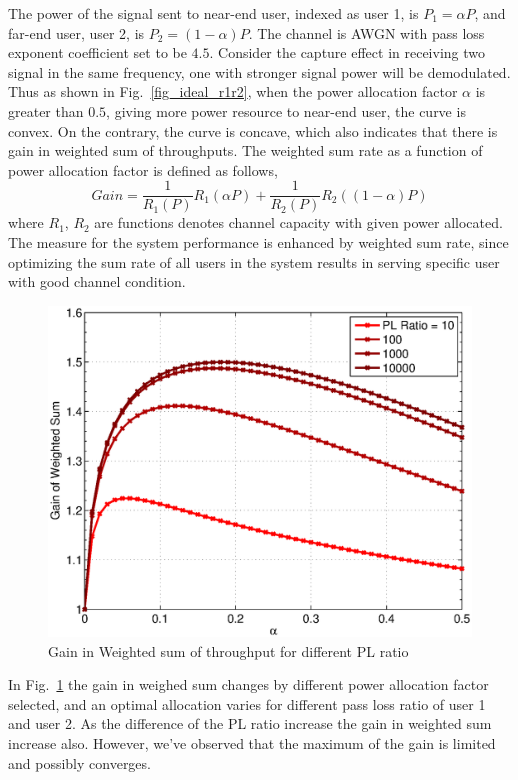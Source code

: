 The power of the signal sent to near-end user, indexed as user 1, is $P_1=\alpha P$,
and far-end user, user 2, is $P_2=(1-\alpha)P$.
The channel is AWGN with pass loss exponent coefficient set to be $4.5$.
Consider the capture effect in receiving two signal in the same frequency, one with
stronger signal power will be demodulated. 
Thus as shown in Fig.~\ref{fig_ideal_r1r2}, when the power allocation factor $\alpha$
is greater than $0.5$, giving more power resource to near-end user, the curve is
convex. 
On the contrary, the curve is concave, which also indicates that there is
gain in weighted sum of throughputs.
The weighted sum rate \cite{cite_bell1} as a function of power allocation factor is 
defined as follows,
\begin{equation}
\label{eq_sic_weighted_sum_rate}
Gain = \frac{1}{R_1(P)}R_1(\alpha P) + \frac{1}{R_2(P)}R_2((1-\alpha)P)
\end{equation}
where $R_1$, $R_2$ are functions denotes channel capacity with given power allocated.
The measure for the system performance is enhanced by weighted sum rate, since optimizing
the sum rate of all users in the system results in serving specific user with good channel
condition.
\begin{figure}[t]
\begin{center}
\includegraphics[width=1.0\columnwidth ,angle=0]{figure/alphaVSgain.eps}
\caption{Gain in Weighted sum of throughput for different PL ratio}
\label{fig_ideal_gain}
\end{center}
\end{figure}
In Fig.~\ref{fig_ideal_gain} the gain in weighed sum changes by different power allocation 
factor selected, and an optimal allocation varies for different pass loss ratio of user 1
and user 2.
As the difference of the PL ratio increase the gain in weighted sum increase also.
However, we've observed that the maximum of the gain is limited and possibly converges.

